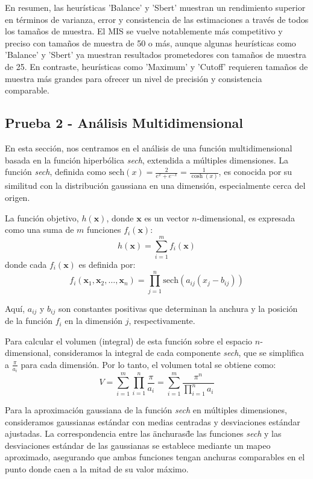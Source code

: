 \documentclass{article}
\begin{document}
En resumen, las heurísticas 'Balance' y 'Sbert' muestran un rendimiento superior en términos de varianza, error y consistencia de las estimaciones a través de todos los tamaños de muestra. El MIS se vuelve notablemente más competitivo y preciso con tamaños de muestra de 50 o más, aunque algunas heurísticas como 'Balance' y 'Sbert' ya muestran resultados prometedores con tamaños de muestra de 25. En contraste, heurísticas como 'Maximum' y 'Cutoff' requieren tamaños de muestra más grandes para ofrecer un nivel de precisión y consistencia comparable.

\subsection{Prueba 2 - Análisis Multidimensional}

En esta sección, nos centramos en el análisis de una función multidimensional basada en la función hiperbólica \textit{sech}, extendida a múltiples dimensiones. La función \textit{sech}, definida como \( \text{sech}(x) = \frac{2}{e^x + e^{-x}} = \frac{1}{\cosh(x)} \), es conocida por su similitud con la distribución gaussiana en una dimensión, especialmente cerca del origen.

La función objetivo, \( h(\mathbf{x}) \), donde \( \mathbf{x} \) es un vector \( n \)-dimensional, es expresada como una suma de \( m \) funciones \( f_i(\mathbf{x}) \):
\[ h(\mathbf{x}) = \sum_{i=1}^{m} f_i(\mathbf{x}) \]
donde cada \( f_i(\mathbf{x}) \) es definida por:
\[ f_i(\mathbf{x}_1, \mathbf{x}_2, \ldots, \mathbf{x}_n) = \prod_{j=1}^{n} \text{sech}(a_{ij} (x_j - b_{ij})) \]

Aquí, \( a_{ij} \) y \( b_{ij} \) son constantes positivas que determinan la anchura y la posición de la función \( f_i \) en la dimensión \( j \), respectivamente.

Para calcular el volumen (integral) de esta función sobre el espacio \( n \)-dimensional, consideramos la integral de cada componente \textit{sech}, que se simplifica a \( \frac{\pi}{a_i} \) para cada dimensión. Por lo tanto, el volumen total se obtiene como:
\[ V = \sum_{i=1}^{m} \prod_{i=1}^{n} \frac{\pi}{a_i} = \sum_{i=1}^{m} \frac{\pi^n}{\prod_{i=1}^{n} a_i} \]

Para la aproximación gaussiana de la función \textit{sech} en múltiples dimensiones, consideramos gaussianas estándar con medias centradas y desviaciones estándar ajustadas.
La correspondencia entre las \"anchuras\" de las funciones \textit{sech} y las desviaciones estándar de las gaussianas se establece mediante un mapeo aproximado, asegurando que ambas funciones tengan anchuras comparables en el punto donde caen a la mitad de su valor máximo.
\end{document}
